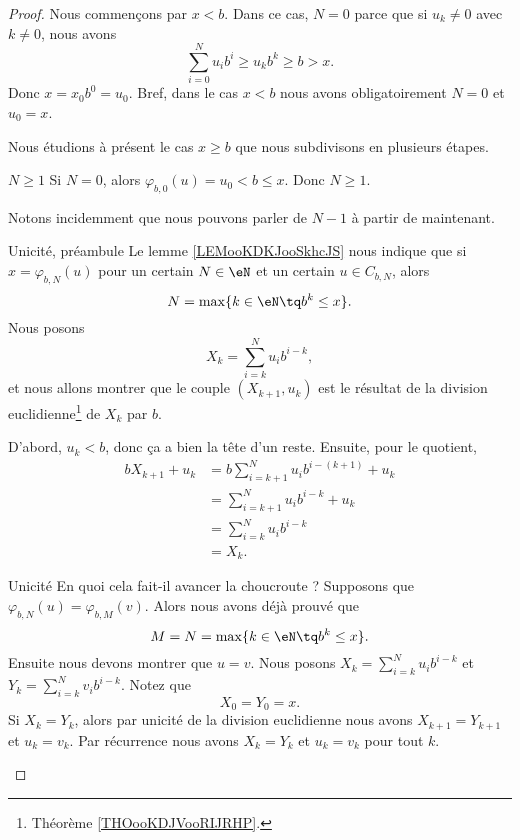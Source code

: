 \begin{proof}
	Nous commençons par \( x<b\). Dans ce cas, \( N=0\) parce que si \( u_k\neq 0\) avec \( k\neq 0\), nous avons
	\begin{equation}
		\sum_{i=0}^Nu_ib^i\geq u_kb^k\geq b>x.
	\end{equation}
	Donc \( x=x_0b^0=u_0\). Bref, dans le cas \( x<b\) nous avons obligatoirement \( N=0\) et \( u_0=x\).

	Nous étudions à présent le cas \( x\geq b\) que nous subdivisons en plusieurs étapes.
	\begin{subproof}
		\item[\( N\geq 1\)]
		Si \( N=0\), alors \( \varphi_{b,0}(u)=u_0<b\leq x\). Donc \( N\geq 1\).

		Notons incidemment que nous pouvons parler de \( N-1\) à partir de maintenant.
		\item[Unicité, préambule]
		Le lemme \ref{LEMooKDKJooSkhcJS} nous indique que si \( x=\varphi_{b,N}(u)\) pour un certain \( N\in \eN\) et un certain \( u\in C_{b,N}\), alors
		\begin{equation}
			N=\max\{ k\in \eN\tq b^k\leq x \}.
		\end{equation}
		Nous posons
		\begin{equation}
			X_k=\sum_{i=k}^Nu_ib^{i-k},
		\end{equation}
		et nous allons montrer que le couple \( (X_{k+1}, u_k)\) est le résultat de la division euclidienne\footnote{Théorème \ref{THOooKDJVooRIJRHP}.} de \( X_k\) par \(b\).

		D'abord, \( u_k<b\), donc ça a bien la tête d'un reste. Ensuite, pour le quotient,
		\begin{subequations}
			\begin{align}
				bX_{k+1}+u_k & =b\sum_{i=k+1}^Nu_ib^{i-(k+1)}+u_k \\
				             & =\sum_{i=k+1}^Nu_ib^{i-k}+u_k      \\
				             & =\sum_{i=k}^Nu_ib^{i-k}            \\
				             & =X_k.
			\end{align}
		\end{subequations}
		\item[Unicité]
		En quoi cela fait-il avancer la choucroute ? Supposons que \( \varphi_{b,N}(u)=\varphi_{b,M}(v)\). Alors nous avons déjà prouvé que
		\begin{equation}
			M=N=\max\{ k\in \eN\tq b^k\leq x \}.
		\end{equation}
		Ensuite nous devons montrer que \( u=v\). Nous posons \( X_k=\sum_{i=k}^Nu_ib^{i-k}\) et \( Y_k=\sum_{i=k}^Nv_ib^{i-k}\). Notez que
		\begin{equation}
			X_0=Y_0=x.
		\end{equation}
		Si \( X_k=Y_k\), alors par unicité de la division euclidienne nous avons \( X_{k+1}=Y_{k+1}\) et \( u_k=v_k\). Par récurrence nous avons \( X_k=Y_k\) et \( u_k=v_k\) pour tout \( k\).


\end{subproof}
\end{proof}
